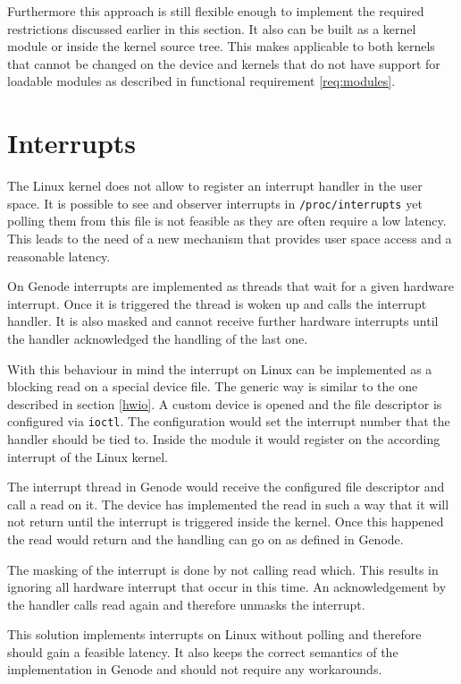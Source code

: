 \documentclass[
a4paper,
12pt,
notitlepage,
parskip=half,
DIV=11,
]{scrbook}
\begin{document}
		Furthermore this approach is still flexible enough to implement the required restrictions discussed earlier in this section.
		It also can be built as a kernel module or inside the kernel source tree.
		This makes applicable to both kernels that cannot be changed on the device and kernels that do not have support for loadable modules as described in functional requirement \ref{req:modules}.
		
		\section{Interrupts}
		\label{irq}
		
		The Linux kernel does not allow to register an interrupt handler in the user space.
		It is possible to see and observer interrupts in \texttt{/proc/interrupts} yet polling them from this file is not feasible as they are often require a low latency.
		This leads to the need of a new mechanism that provides user space access and a reasonable latency.
		
		On Genode interrupts are implemented as threads that wait for a given hardware interrupt.
		Once it is triggered the thread is woken up and calls the interrupt handler.
		It is also masked and cannot receive further hardware interrupts until the handler acknowledged the handling of the last one. \citep{genode}
		
		With this behaviour in mind the interrupt on Linux can be implemented as a blocking read on a special device file.
		The generic way is similar to the one described in section \ref{hwio}.
		A custom device is opened and the file descriptor is configured via \texttt{ioctl}.
		The configuration would set the interrupt number that the handler should be tied to.
		Inside the module it would register on the according interrupt of the Linux kernel.
		
		The interrupt thread in Genode would receive the configured file descriptor and call a read on it.
		The device has implemented the read in such a way that it will not return until the interrupt is triggered inside the kernel.
		Once this happened the read would return and the handling can go on as defined in Genode.
		
		The masking of the interrupt is done by not calling read which.
		This results in ignoring all hardware interrupt that occur in this time.
		An acknowledgement by the handler calls read again and therefore unmasks the interrupt.
		
		This solution implements interrupts on Linux without polling and therefore should gain a feasible latency.
		It also keeps the correct semantics of the implementation in Genode and should not require any workarounds.
		
\end{document}
